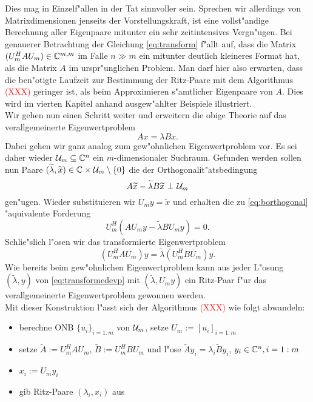 Dies mag in Einzelf"allen in der Tat sinnvoller sein. Sprechen wir allerdings
von Matrixdimensionen jenseits der Vorstellungskraft, ist eine vollst"andige
Berechnung aller Eigenpaare mitunter ein sehr zeitintensives Vergn"ugen. Bei
genauerer Betrachtung der Gleichung \eqref{eq:transform} f"allt auf, dass die
Matrix $(U_m^H A U_m) \in \mathbb{C}^{m,m}$ im Falle $n \gg m$ ein mitunter deutlich kleineres
Format hat, als die Matrix $A$ im urspr"unglichen Problem. Man darf hier also erwarten,
dass die ben"otigte Laufzeit zur Bestimmung der Ritz-Paare mit dem Algorithmus \textcolor{red}{(XXX)}
geringer ist, als beim Approximieren s"amtlicher Eigenpaare von $A$. Dies
wird im vierten Kapitel anhand ausgew"ahlter Beispiele illustriert.\\

Wir gehen nun einen Schritt weiter und erweitern die obige Theorie auf das
verallgemeinerte Eigenwertproblem
\begin{equation}\label{chap2:gevp}
Ax = \lambda Bx.
\end{equation}
Dabei gehen wir ganz analog zum gew"ohnlichen Eigenwertproblem vor.
Es sei daher wieder $\mathcal{U}_m\subseteq \mathbb{C}^n$ ein $m$-dimensionaler Suchraum.
Gefunden werden sollen nun Paare $ (\widetilde{\lambda}, \widetilde{x}) \in \mathbb{C}
\times \mathcal{U}_m \setminus\{ 0\}$ die der Orthogonalit"atsbedingung
\begin{equation}\label{eq:borthogonal}
A\widetilde{x} - \widetilde{\lambda}B\widetilde{x} \ \bot \ \U_m
\end{equation}
gen"ugen. Wieder substituieren wir $U_m y=\widetilde{x}$ und erhalten die
zu \eqref{eq:borthogonal} "aquivalente Forderung
\[
U_m^H(AU_m y - \widetilde{\lambda} BU_m y) = 0.
\]
Schlie"slich l"osen wir das transformierte Eigenwertproblem
\begin{equation}\label{eq:transformedevp}
(U_m^H AU_m) y = \widetilde{\lambda} (U_m^H B U_m) y.
\end{equation}
Wie bereits beim gew"ohnlichen Eigenwertproblem kann aus jeder L"osung $(\widetilde{\lambda}, y)$ von \eqref{eq:transformedevp}
mit $(\widetilde{\lambda}, U_m y)$ ein Ritz-Paar f"ur das verallgemeinerte Eigenwertproblem
gewonnen werden.\\

Mit dieser Konstruktion l"asst sich der Algorithmus \textcolor{red}{(XXX)}
wie folgt abwandeln:

\begin{itemize}
\item berechne ONB $\{u_i\}_{i=1:m}$ von $\mathcal{U}_m$, setze $U_m := [u_i]_{i=1:m}$
\item setze $\widetilde{A} := U_m^H AU_m$, $\widetilde{B}:= U_m^H BU_m$ und l"ose
$\widetilde{A} y_i = \lambda_i \widetilde{B}y_i$, $y_i \in \mathbb{C}^n, i=1:m$
\item $x_i := U_m y_i$
\item gib Ritz-Paare $(\lambda_i, x_i)$ aus
\end{itemize}

